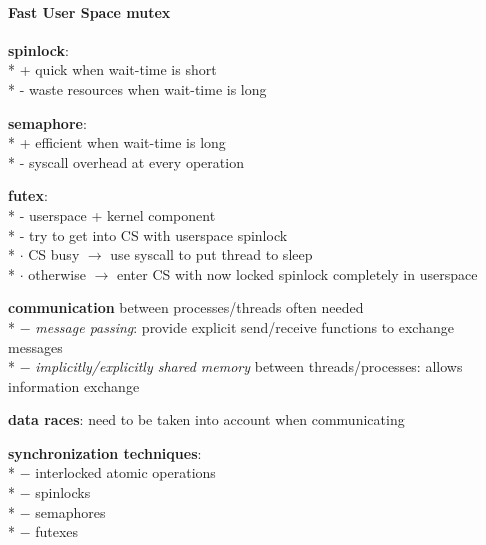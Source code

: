 \paragraph{Fast User Space mutex}
\begin{items}
  \item \textbf{spinlock}: \\*
    + quick when wait-time is short \\*
    - waste resources when wait-time is long
  \item \textbf{semaphore}: \\*
    + efficient when wait-time is long \\*
    - syscall overhead at every operation
  \item \textbf{futex}: \\*
    - userspace + kernel component \\*
    - try to get into CS with userspace spinlock \\*
    \phantom{-} \( \cdot \) CS busy \( \to \) use syscall to put thread to sleep \\*
    \phantom{-} \( \cdot \) otherwise \( \to \) enter CS with now locked spinlock completely in userspace
\end{items}

\begin{summary}
  \begin{items}
    \item \textbf{communication} between processes/threads often needed \\*
      $ - $ \emph{message passing}: provide explicit send/receive functions to exchange messages \\*
      $ - $ \emph{implicitly/explicitly shared memory} between threads/processes: allows information exchange
    \item \textbf{data races}: need to be taken into account when communicating
    \item \textbf{synchronization techniques}: \\*
      $ - $ interlocked atomic operations \\*
      $ - $ spinlocks \\*
      $ - $ semaphores \\*
      $ - $ futexes
  \end{items}
\end{summary}
